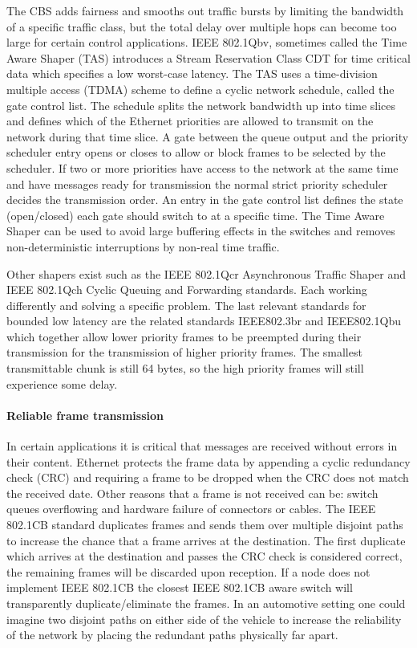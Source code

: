 The CBS adds fairness and smooths out traffic bursts by limiting the bandwidth of a specific traffic class, but the total delay over multiple hops can become too large for certain control applications. IEEE 802.1Qbv, sometimes called the Time Aware Shaper (TAS) introduces a Stream Reservation Class CDT for time critical data which specifies a low worst-case latency. The TAS uses a time-division multiple access (TDMA) scheme to define a cyclic network schedule, called the gate control list. The schedule splits the network bandwidth up into time slices and defines which of the Ethernet priorities are allowed to transmit on the network during that time slice. A gate between the queue output and the priority scheduler entry opens or closes to allow or block frames to be selected by the scheduler. If two or more priorities have access to the network at the same time and have messages ready for transmission the normal strict priority scheduler decides the transmission order. An entry in the gate control list defines the state (open/closed) each gate should switch to at a specific time. The Time Aware Shaper can be used to avoid large buffering effects in the switches and removes non-deterministic interruptions by non-real time traffic.

Other shapers exist such as the IEEE 802.1Qcr Asynchronous Traffic Shaper and IEEE 802.1Qch Cyclic Queuing and Forwarding standards. Each working differently and solving a specific problem. The last relevant standards for bounded low latency are the related standards IEEE802.3br and IEEE802.1Qbu which together allow lower priority frames to be preempted during their transmission for the transmission of higher priority frames. The smallest transmittable chunk is still 64 bytes, so the high priority frames will still experience some delay.

\paragraph{Reliable frame transmission} In certain applications it is critical that messages are received without errors in their content. Ethernet protects the frame data by appending a cyclic redundancy check (CRC) and requiring a frame to be dropped when the CRC does not match the received date. Other reasons that a frame is not received can be: switch queues overflowing and hardware failure of connectors or cables. The IEEE 802.1CB standard duplicates frames and sends them over multiple disjoint paths to increase the chance that a frame arrives at the destination. The first duplicate which arrives at the destination and passes the CRC check is considered correct, the remaining frames will be discarded upon reception. If a node does not implement IEEE 802.1CB the closest IEEE 802.1CB aware switch will transparently duplicate/eliminate the frames. In an automotive setting one could imagine two disjoint paths on either side of the vehicle to increase the reliability of the network by placing the redundant paths physically far apart. 

